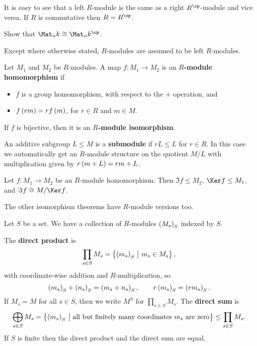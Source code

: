 It is easy to see that a left $ R $-module is the same as a right $ R^{\op} $-module and vice versa. If $ R $ is commutative then $ R = R^{\op} $.

\begin{exercise*}
Show that $ \Mat_n k \cong \Mat_n k^{\op} $.
\end{exercise*}

Except where otherwise stated, $ R $-modules are assumed to be left $ R $-modules.

\pagebreak

\begin{definition}
Let $ M_1 $ and $ M_2 $ be $ R $-modules. A map $ f : M_1 \to M_2 $ is an \textbf{$ R $-module homomorphism} if
\begin{itemize}
\item $ f $ is a group homomorphism, with respect to the $ + $ operation, and
\item $ f\br{rm} = rf\br{m} $, for $ r \in R $ and $ m \in M $.
\end{itemize}
If $ f $ is bijective, then it is an \textbf{$ R $-module isomorphism}.
\end{definition}

\begin{definition}
An additive subgroup $ L \le M $ is a \textbf{submodule} if $ rL \le L $ for $ r \in R $. In this case we automatically get an $ R $-module structure on the quotient $ M / L $ with multiplication given by $ r\br{m + L} = rm + L $.
\end{definition}

\begin{theorem}
Let $ f : M_1 \to M_2 $ be an $ R $-module homomorphism. Then $ \Im f \le M_2 $, $ \Ker f \le M_1 $, and $ \Im f \cong M / \Ker f $.
\end{theorem}

The other isomorphism theorems have $ R $-module versions too.


Let $ S $ be a set. We have a collection of $ R $-modules $ \br{M_s}_S $ indexed by $ S $.

\begin{definition}
The \textbf{direct product} is
$$ \prod_{s \in S} M_s = \cbr{\br{m_s}_S \st m_s \in M_s}, $$
with coordinate-wise addition and $ R $-multiplication, so
$$ \br{m_s}_S + \br{n_s}_S = \br{m_s + n_s}_S, \qquad r\br{m_s}_S = \br{rm_s}_S. $$
If $ M_s = M $ for all $ s \in S $, then we write $ M^S $ for $ \prod_{s \in S} M_s $. The \textbf{direct sum} is
$$ \bigoplus_{s \in S} M_s = \cbr{\br{m_s}_S \st \text{all but finitely many coordinates} \ m_s \ \text{are zero}} \le \prod_{s \in S} M_s. $$
If $ S $ is finite then the direct product and the direct sum are equal.
\end{definition}

